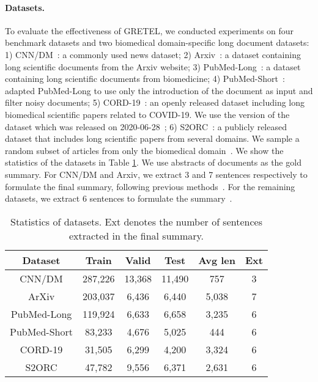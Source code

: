 \documentclass[11pt]{article}
\begin{document}
\paragraph{Datasets.}
To evaluate the effectiveness of GRETEL, we conducted experiments on four benchmark datasets and two biomedical domain-specific long document datasets:
1) CNN/DM~\cite{hermann2015teaching}: a commonly used news dataset;
2) Arxiv~\cite{cohan2018discourse}: a dataset containing long scientific documents from the Arxiv website;
3) PubMed-Long~\cite{cohan2018discourse}: a  dataset containing long scientific documents from biomedicine;
4) PubMed-Short~\cite{zhong2020extractive}: adapted PubMed-Long to use only the introduction of the document as input and filter noisy documents;
5) CORD-19~\cite{wang2020cord}: an openly released dataset including long biomedical scientific papers related to COVID-19. We use the version of the dataset which was released on 2020-06-28~\cite{bishop2022gencomparesum,xie2022pre};
6) S2ORC~\cite{lo2020s2orc}: a publicly released dataset that includes long scientific papers from several domains. We sample a random subset of articles from only the biomedical domain~\cite{bishop2022gencomparesum,xie2022pre}.
We show the statistics of the datasets in Table \ref{tab:statistics}.
We use abstracts of documents as the gold summary.
For CNN/DM and Arxiv, we extract 3 and 7 sentences respectively to formulate the final summary, following previous methods~\cite{zhong2020extractive}.
For the remaining datasets, we extract 6 sentences to formulate the summary~\cite{bishop2022gencomparesum,xie2022pre}.
\begin{table}[!hbt]
\scriptsize
    \centering
    \begin{tabular}{c|ccccc}
    \hline
    \bf{Dataset}& \bf{Train}& \bf{Valid}& \bf{Test} & \bf{Avg len}&\bf{Ext} \\
    \hline
    CNN/DM&287,226&13,368&11,490&757&3\\
    ArXiv&203,037&6,436&6,440&5,038&7\\
    PubMed-Long&119,924& 6,633&	6,658&3,235&6\\
    PubMed-Short&83,233&4,676&5,025&444&6\\
    CORD-19 & 31,505 & 6,299&4,200&3,324&6\\
    S2ORC&47,782&9,556&	6,371&2,631&6\\
    \hline
    \end{tabular}
     \caption{Statistics of datasets. Ext denotes the number of sentences extracted in the final summary.}
    \label{tab:statistics}
\end{table}
\end{document}
